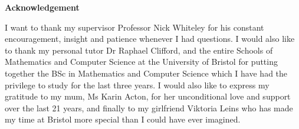 \thispagestyle{plain}
\mbox{}
\vspace{60mm}
\begin{center}
    \textbf{Acknowledgement}
\end{center}
I want to thank my supervisor Professor Nick Whiteley for his constant encouragement, 
insight and patience whenever I had questions. I would also like to thank my personal tutor Dr Raphael Clifford, 
and the entire Schools of Mathematics and Computer Science at the University of Bristol for putting together the 
BSc in Mathematics and Computer Science which I have had the privilege to study for the last three years.
\newline\newline
I would also like to express my gratitude to my mum, Ms Karin Acton, for her unconditional love and support over the last 21 years, 
and finally to my girlfriend Viktoria Leins who has made my time at Bristol more special than I could have ever imagined.
\newpage